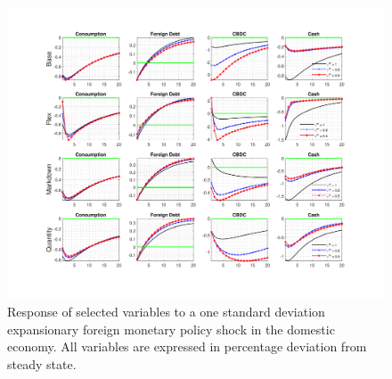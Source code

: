 \documentclass[12pt, a4paper]{article}
\begin{document}
\begin{figure}[H]
  \hspace{-0.1cm}
	\centering
	\centerline{\includegraphics[trim = 0mm 23mm 0mm 18mm, clip, scale=0.93]{foreign_sto.pdf}}
	\caption{Response of selected variables to a one standard deviation expansionary foreign monetary policy shock in the domestic economy. All variables are expressed in percentage deviation from steady state.}
	\label{foralt_sto}
\end{figure}
\end{document}
